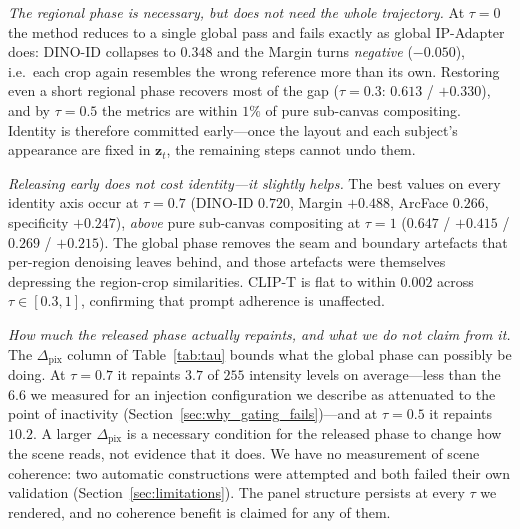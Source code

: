 \documentclass[review,10pt,times]{elsarticle}
\begin{document}
\noindent\textit{The regional phase is necessary, but does not need the
whole trajectory.}
At $\tau{=}0$ the method reduces to a single global pass and fails exactly
as global IP-Adapter does: DINO-ID collapses to $0.348$ and the Margin
turns \emph{negative} ($-0.050$), i.e.\ each crop again resembles the wrong
reference more than its own.  Restoring even a short regional phase
recovers most of the gap ($\tau{=}0.3$: $0.613$ / $+0.330$), and by
$\tau{=}0.5$ the metrics are within $1\%$ of pure sub-canvas compositing.
Identity is therefore committed early---once the layout and each subject's
appearance are fixed in $\mathbf{z}_t$, the remaining steps cannot undo
them.

\noindent\textit{Releasing early does not cost identity---it slightly helps.}
The best values on every identity axis occur at $\tau{=}0.7$
(DINO-ID $0.720$, Margin $+0.488$, ArcFace $0.266$, specificity $+0.247$),
\emph{above} pure sub-canvas compositing at $\tau{=}1$
($0.647$ / $+0.415$ / $0.269$ / $+0.215$).  The global phase removes the
seam and boundary artefacts that per-region denoising leaves behind, and
those artefacts were themselves depressing the region-crop similarities.
CLIP-T is flat to within $0.002$ across $\tau\in[0.3,1]$, confirming that
prompt adherence is unaffected.

\noindent\textit{How much the released phase actually repaints, and what we
do not claim from it.}
The $\Delta_{\mathrm{pix}}$ column of Table~\ref{tab:tau} bounds what the
global phase can possibly be doing.  At $\tau{=}0.7$ it repaints $3.7$ of
$255$ intensity levels on average---less than the $6.6$ we measured for an
injection configuration we describe as attenuated to the point of
inactivity (Section~\ref{sec:why_gating_fails})---and at $\tau{=}0.5$ it
repaints $10.2$.  A larger $\Delta_{\mathrm{pix}}$ is a necessary condition
for the released phase to change how the scene reads, not evidence that it
does.  We have no measurement of scene coherence: two automatic constructions were
attempted and both failed their own validation
(Section~\ref{sec:limitations}).  The panel structure persists at every
$\tau$ we rendered, and no coherence benefit is claimed for any of them.
\end{document}
